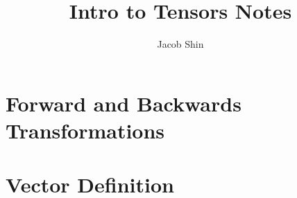 \documentclass{report}
\title{\Huge{Intro to Tensors Notes}\\}
\author{\huge{Jacob Shin}}
\date{}
\begin{document}
\maketitle
\newpage%
\tableofcontents
\pagebreak

\chapter{Forward and Backwards Transformations}

\chapter{Vector Definition}
\end{document}
